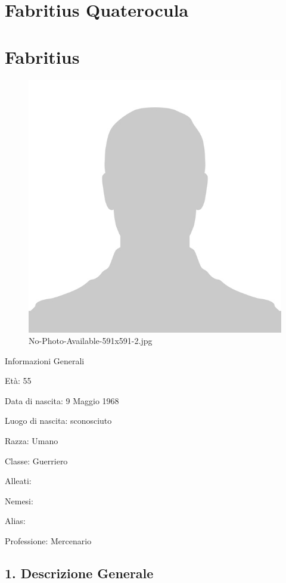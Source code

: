 \section{Fabritius Quaterocula}
\section{Fabritius}


\begin{figure}
\centering
\includegraphics{No-Photo-Available-591x591-2.jpg}
\caption{No-Photo-Available-591x591-2.jpg}
\end{figure}

Informazioni Generali

Età: 55

Data di nascita: 9 Maggio 1968

Luogo di nascita: sconosciuto

Razza: Umano

Classe: Guerriero

Alleati:

Nemesi:

Alias:

Professione: Mercenario


\subsection{1. Descrizione Generale}\label{descrizione-generale}


